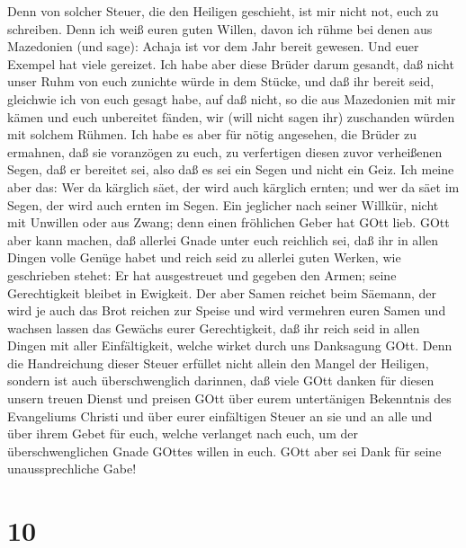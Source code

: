  Denn von solcher Steuer, die den Heiligen geschieht, ist
mir nicht not, euch zu schreiben.  Denn ich weiß euren guten
Willen, davon ich rühme bei denen aus Mazedonien (und sage): Achaja ist
vor dem Jahr bereit gewesen. Und euer Exempel hat viele gereizet.
 Ich habe aber diese Brüder darum gesandt, daß nicht unser
Ruhm von euch zunichte würde in dem Stücke, und daß ihr bereit seid,
gleichwie ich von euch gesagt habe,  auf daß nicht, so die
aus Mazedonien mit mir kämen und euch unbereitet fänden, wir (will nicht
sagen ihr) zuschanden würden mit solchem Rühmen.  Ich habe
es aber für nötig angesehen, die Brüder zu ermahnen, daß sie voranzögen
zu euch, zu verfertigen diesen zuvor verheißenen Segen, daß er bereitet
sei, also daß es sei ein Segen und nicht ein Geiz.  Ich
meine aber das: Wer da kärglich säet, der wird auch kärglich ernten; und
wer da säet im Segen, der wird auch ernten im Segen.  Ein
jeglicher nach seiner Willkür, nicht mit Unwillen oder aus Zwang; denn
einen fröhlichen Geber hat GOtt lieb.  GOtt aber kann
machen, daß allerlei Gnade unter euch reichlich sei, daß ihr in allen
Dingen volle Genüge habet und reich seid zu allerlei guten Werken,
 wie geschrieben stehet: Er hat ausgestreuet und gegeben den
Armen; seine Gerechtigkeit bleibet in Ewigkeit.  Der aber
Samen reichet beim Säemann, der wird je auch das Brot reichen zur Speise
und wird vermehren euren Samen und wachsen lassen das Gewächs eurer
Gerechtigkeit,  daß ihr reich seid in allen Dingen mit
aller Einfältigkeit, welche wirket durch uns Danksagung GOtt.
 Denn die Handreichung dieser Steuer erfüllet nicht allein
den Mangel der Heiligen, sondern ist auch überschwenglich darinnen, daß
viele GOtt danken für diesen unsern treuen Dienst  und
preisen GOtt über eurem untertänigen Bekenntnis des Evangeliums Christi
und über eurer einfältigen Steuer an sie und an alle  und
über ihrem Gebet für euch, welche verlanget nach euch, um der
überschwenglichen Gnade GOttes willen in euch.  GOtt aber
sei Dank für seine unaussprechliche Gabe!

\hypertarget{section-9}{%
\section{10}\label{section-9}}

